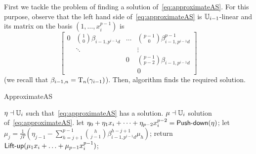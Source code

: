 First we tackle the problem of finding a solution
of~\eqref{eq:approximateAS}.  For this purpose, observe that the left
hand side of~\eqref{eq:approximateAS} is $\mathbb{U}_{i-1}$-linear and its
matrix on the basis $(1,\ldots,x_i^{p-1})$ is
\begin{equation*}
  \label{eq:approximate-matrix}
  \begin{bmatrix}
    0 & \binom{1}{0}\beta_{i-1,p^{i-1}d} & \hdots & \binom{p-1}{0}\beta_{i-1,p^{i-1}d}^{p-1} \\
      & \ddots          &        & \vdots               \\
      &                 & 0      &\binom{p-1}{p-2}\beta_{i-1,p^{i-1}d} \\
      &                 &        & 0
  \end{bmatrix}
\end{equation*}
(we recall that $\beta_{i-1,n}=\operatorname{T}_{n}(\gamma_{i-1})$).  Then,
algorithm  finds the required solution.




\begin{algorithm}
  \caption{ApproximateAS} 
  \begin{algorithmic}[1]
    \REQUIRE $\eta\dashv\mathbb{U}_i$ such that~\eqref{eq:approximateAS} has a solution.
    \ENSURE $\mu\dashv\mathbb{U}_i$ solution of~\eqref{eq:approximateAS}.
    \STATE let $\eta_0 + \eta_1 x_i + \dots + \eta_{p-2} x_i^{p-2}=\text{{\sf Push-down}}(\eta)$;
    \STATE let $\mu_j =
   \frac{1}{jT}\left(\eta_{j-1} -
     \sum_{h=j+1}^{p-1}\binom{h}{j-1}\beta_{i-1,p^{i-1}d}^{h-j+1}\mu_h\right)$;
   \ENDFOR
   \STATE return $\text{{\sf Lift-up}}(\mu_1 x_i + \ldots + \mu_{p-1} x_i^{p-1})$;
\end{algorithmic}
\end{algorithm}


